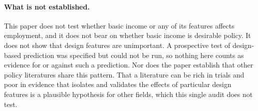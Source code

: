 \documentclass[11pt]{article}
\begin{document}
\paragraph{What is not established.} This paper does not test whether basic income or any of its features affects employment, and it does not bear on whether basic income is desirable policy. It does not show that design features are unimportant. A prospective test of design-based prediction was specified but could not be run, so nothing here counts as evidence for or against such a prediction. Nor does the paper establish that other policy literatures share this pattern. That a literature can be rich in trials and poor in evidence that isolates and validates the effects of particular design features is a plausible hypothesis for other fields, which this single audit does not test.
\end{document}
